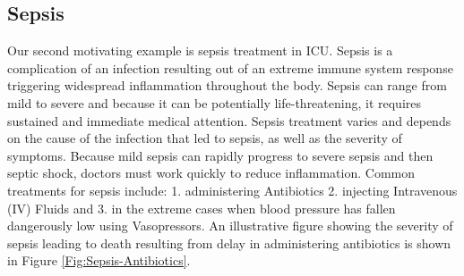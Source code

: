 \subsection{Sepsis}

Our second motivating example is sepsis treatment in ICU. Sepsis is a complication of an infection resulting out of an extreme immune system response triggering widespread inflammation throughout the body. Sepsis can range from mild to severe and because it can be potentially life-threatening, it requires sustained and immediate medical attention. Sepsis treatment varies and depends on the cause of the infection that led to sepsis, as well as the severity of symptoms. Because mild sepsis can rapidly progress to severe sepsis and then septic shock, doctors must work quickly to reduce inflammation. Common treatments for sepsis include: 1. administering Antibiotics 2. injecting Intravenous (IV) Fluids and 3. in the extreme cases when blood pressure has fallen dangerously low using Vasopressors. An illustrative figure showing the severity of sepsis leading to death resulting from delay in administering antibiotics is shown in Figure \ref{Fig:Sepsis-Antibiotics}.

